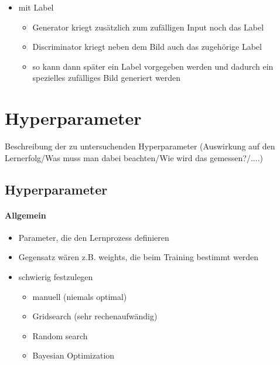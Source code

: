 \begin{itemize}
	\item mit Label
	\begin{itemize}
		\item Generator kriegt zusätzlich zum zufälligen Input noch das Label
		\item Discriminator kriegt neben dem Bild auch das zugehörige Label
		\item so kann dann später ein Label vorgegeben werden und dadurch ein spezielles zufälliges Bild generiert werden
	\end{itemize}
\end{itemize}

\section{Hyperparameter}
Beschreibung der zu untersuchenden Hyperparameter (Auswirkung auf den Lernerfolg/Was muss man dabei beachten/Wie wird das gemessen?/....)

\subsection{Hyperparameter}
\paragraph{Allgemein \cite{hyperparameters-search-in-machine-learning, hyperparameters-gan-using-genetic-algorithm}}
\begin{itemize}
	\item Parameter, die den Lernprozess definieren
	\item Gegensatz wären z.B. weights, die beim Training bestimmt werden
	\item schwierig festzulegen
	\begin{itemize}
		\item manuell (niemals optimal)
		\item Gridsearch (sehr rechenaufwändig)  \cite{hyperparameters-grid-search}
		\item Random search
		\item Bayesian Optimization
	\end{itemize}
\end{itemize}

